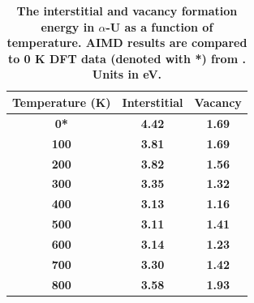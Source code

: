 \documentclass[utf8]{frontiersSCNS} %
\providecommand{\DIFaddtex}[1]{{\bf #1}} %
\providecommand{\DIFaddFL}[1]{\DIFadd{#1}} %
\providecommand{\DIFadd}[1]{\texorpdfstring{\DIFaddtex{#1}}{#1}} %
\begin{document}
\begin{table}[h]
\caption{\DIFaddFL{The interstitial and vacancy formation energy in $\alpha$-U as a function of temperature. AIMD results are compared to 0 K DFT data (denoted with *) from \cite{wirth2011}. Units in eV.}} \label{tab:eform}
\begin{center}
\begin{tabular}{|c|c|c|}
	\hline
	\DIFaddFL{Temperature (K) }& \DIFaddFL{Interstitial }& \DIFaddFL{Vacancy }\\
	 \hline
\DIFaddFL{0* }& \DIFaddFL{4.42 }& \DIFaddFL{1.69 }\\
\DIFaddFL{100 }&	\DIFaddFL{3.81 }&	\DIFaddFL{1.69 }\\
\DIFaddFL{200 }&	\DIFaddFL{3.82 }&	\DIFaddFL{1.56 }\\
\DIFaddFL{300 }&	\DIFaddFL{3.35 }&	\DIFaddFL{1.32 }\\
\DIFaddFL{400 }&	\DIFaddFL{3.13 }&	\DIFaddFL{1.16 }\\
\DIFaddFL{500 }&	\DIFaddFL{3.11 }&	\DIFaddFL{1.41 }\\
\DIFaddFL{600 }&	\DIFaddFL{3.14 }&	\DIFaddFL{1.23 }\\
\DIFaddFL{700 }&	\DIFaddFL{3.30 }& \DIFaddFL{1.42 }\\
\DIFaddFL{800 }&	\DIFaddFL{3.58 }&	\DIFaddFL{1.93 }\\
	 \hline
\end{tabular}
\end{center}
\label{default}
\end{table}
\end{document}
